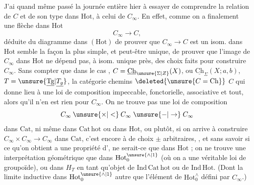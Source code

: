 J'ai quand même passé la journée entière hier à essayer de comprendre la relation de $C$ et de son type dans $\mathrm{Hot}$, à celui de $C_\infty$. En effet, comme on a finalement une flèche dans $\mathrm{Hot}$
\[
C_\infty\longrightarrow C,
\]
déduite du diagramme dans $(\mathrm{Hot})$
de prouver que $C_\infty\longrightarrow C$ est un isom. dans $\mathrm{Hot}$
semble la façon la plus simple, et peut-être unique, de prouver que l'image de $C_\infty$ dans $\mathrm{Hot}$ ne dépend pas, à isom. unique près, des choix faits pour construire $C_\infty$. Sans compter que dans le cas , $C=\underline{\mathrm{Ch}}_{\unsure{\Sigma|Z}}(X)$, ou $\underline{\mathrm{Ch}}_{\Sigma}(X;a,b)$, $T=\unsure{\underline{\mathrm{Tg}}|\underline{T_g}}$,  la catégorie  chemins $\deleted{\unsure{C=\mathrm{Ch}}}$ $C$ qui donne lieu à une  loi de composition  impeccable, fonctorielle, associative et tout, alors qu'il n'en est rien pour $C_\infty$. On ne trouve pas  une loi de composition
\[
C_\infty\mathbin{\unsure{\times|<}}C_\infty\mathrel{\unsure{-|\to}}C_\infty
\]
dans  $\mathrm{Cat}$,  ni même dans $\mathrm{Cat\,hot}$ ou dans $\mathrm{Hot}$, ou plutôt, si on arrive  à  construire  $C_\infty\times C_\infty\longrightarrow C_\infty$ dans $\mathrm{Cat}$, c'est encore  à  de choix $\pm$ arbitraires, , et sans savoir si ce qu'on obtient a une  propriété d', ne serait-ce que dans $\mathrm{Hot}$ ; on ne trouve une interprétation géométrique   que  dans $\mathrm{Hot}_0^{\unsure{\wedge|1}}$ (où on a une véritable loi de groupoïde), ou dans $H_T$ en tant qu'objet de $\mathrm{Ind\,Cat\,hot}$
ou de $\mathrm{Ind\,Hot}$. (Dont la limite inductive dans $\mathrm{Hot}_0^{\unsure{\wedge|1}}$  autre que l'élément de $\mathrm{Hot}_0^\wedge$ défini par $C_\infty$.)

